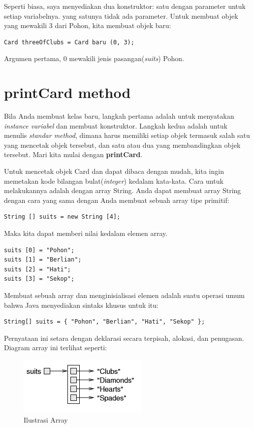 \documentclass[12pt,b5paper,openright,twoside]{book}
\begin{document}
\noindent Seperti biasa, saya menyediakan dua konstruktor: satu dengan parameter untuk setiap variabelnya. yang satunya tidak ada parameter.
\noindent 
\newline
\newline Untuk membuat objek yang mewakili 3 dari Pohon, kita membuat objek baru: 

\begin{lstlisting}
Card threeOfClubs = Card baru (0, 3); 
\end{lstlisting}

\noindent Argumen pertama, 0 mewakili jenis pasangan(\textit{suits}) Pohon.

\section{printCard method}
Bila Anda membuat kelas baru, langkah pertama adalah untuk menyatakan \textit{instance variabel} dan membuat konstruktor. Langkah kedua adalah untuk menulis \textit{standar method}, dimana harus memiliki setiap objek termasuk salah satu yang mencetak objek tersebut, dan satu atau dua yang membandingkan objek tersebut. Mari kita mulai dengan \textbf{printCard}.
 
\noindent Untuk mencetak objek Card dan dapat dibaca dengan mudah, kita ingin memetakan kode bilangan bulat(\textit{integer}) kedalam kata-kata. Cara untuk melakukannya adalah dengan array String. Anda dapat membuat array String dengan cara yang sama dengan Anda membuat sebuah array tipe primitif: 
\begin{lstlisting}
String [] suits = new String [4];
\end{lstlisting}

\noindent Maka kita dapat memberi nilai kedalam elemen array.
\begin{lstlisting}
suits [0] = "Pohon";
suits [1] = "Berlian";
suits [2] = "Hati";
suits [3] = "Sekop";
\end{lstlisting}

\noindent Membuat sebuah array dan menginisialisasi elemen adalah suatu operasi umum bahwa Java menyediakan sintaks khusus untuk itu:
\begin{lstlisting}
String[] suits = { "Pohon", "Berlian", "Hati", "Sekop" };
\end{lstlisting}

\noindent Pernyataan ini setara dengan deklarasi secara terpisah, alokasi, dan penugasan. Diagram array ini terlihat seperti:
\begin{figure}[h!]
\centering
\includegraphics[scale=1]{diagram_array.png}
\caption{Ilustrasi Array}
\label{fig:univerise}
\end{figure}
\end{document}
